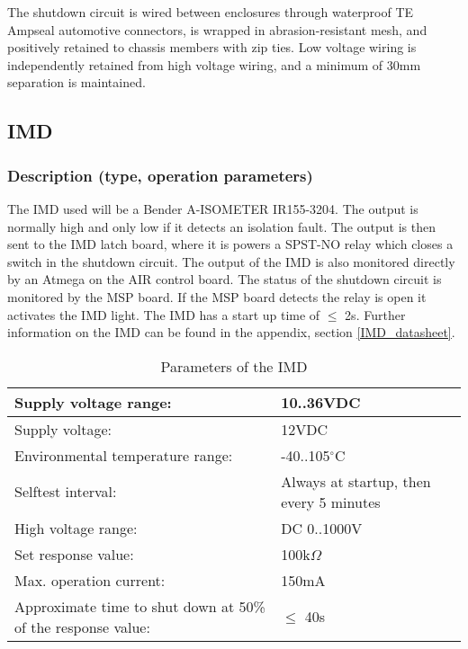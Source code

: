 \documentclass{article}
\begin{document}
The shutdown circuit is wired between enclosures through waterproof TE Ampseal automotive connectors, is wrapped in abrasion-resistant mesh, and positively retained to chassis members with zip ties. Low voltage wiring is independently retained from high voltage wiring, and a minimum of 30mm separation is maintained. 


\subsection{IMD}\label{imd}
\subsubsection{Description (type, operation parameters)}%
The IMD used will be a Bender A-ISOMETER IR155-3204. The output is normally high and only low if it detects an isolation fault. The output is then sent to the IMD latch board, where it is powers a SPST-NO relay which closes a switch in the shutdown circuit. The output of the IMD is also monitored directly by an Atmega on the AIR control board. The status of the shutdown circuit is monitored by the MSP board. If the MSP board detects the relay is  open it activates the IMD light. The IMD has a start up time of $\leq$ 2s. Further information on the IMD can be found in the appendix, section \ref{IMD_datasheet}.





\begin{center}
	\begin{table}[H]
		\begin{tabular}{|l|l|}
			\hline
			Supply voltage range: &  10..36VDC \\
			\hline
			Supply voltage: &  12VDC\\
			\hline
			Environmental temperature range: &  -40..105$^{\circ}$C \\
			\hline
			Selftest interval: &  Always at startup, then every 5 minutes \\
			\hline
			High voltage range: &  DC 0..1000V \\
			\hline
			Set response value: &  100k$\Omega$ \\
			\hline
			Max. operation current: &  150mA \\
			\hline
			Approximate time to shut down at 50\% of the response value:&  $\leq$ 40s \\
			\hline
		\end{tabular}
		\caption{Parameters of the IMD}
		\label{IMDParameters}
	\end{table}
\end{center}
\end{document}
